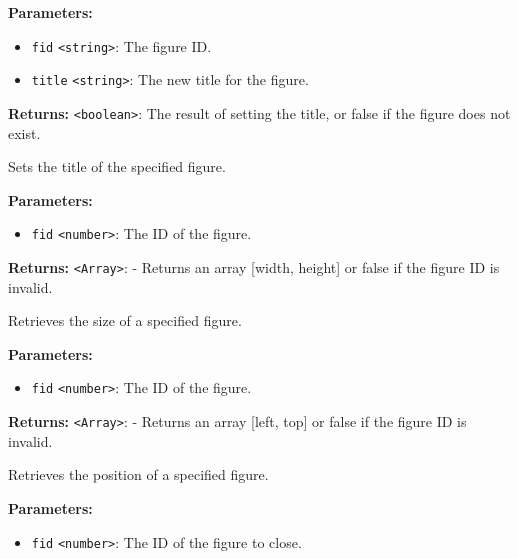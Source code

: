 \documentclass[12pt,a4paper]{article}
\begin{document}
\noindent \textbf{Parameters:}
\begin{itemize}
  \item \texttt{fid} \texttt{<string>}: The figure ID.
  \item \texttt{title} \texttt{<string>}: The new title for the figure.
\end{itemize}

\noindent \textbf{Returns:} \texttt{<boolean>}: The result of setting the title, or false if the figure does not exist.

\noindent Sets the title of the specified figure.

\vspace{5mm}
\noindent {}


\noindent \textbf{Parameters:}
\begin{itemize}
  \item \texttt{fid} \texttt{<number>}: The ID of the figure.
\end{itemize}

\noindent \textbf{Returns:} \texttt{<Array>}: - Returns an array [width, height] or false if the figure ID is invalid.

\noindent Retrieves the size of a specified figure.

\vspace{5mm}
\noindent {}


\noindent \textbf{Parameters:}
\begin{itemize}
  \item \texttt{fid} \texttt{<number>}: The ID of the figure.
\end{itemize}

\noindent \textbf{Returns:} \texttt{<Array>}: - Returns an array [left, top] or false if the figure ID is invalid.

\noindent Retrieves the position of a specified figure.

\vspace{5mm}
\noindent {}


\noindent \textbf{Parameters:}
\begin{itemize}
  \item \texttt{fid} \texttt{<number>}: The ID of the figure to close.
\end{itemize}
\end{document}
